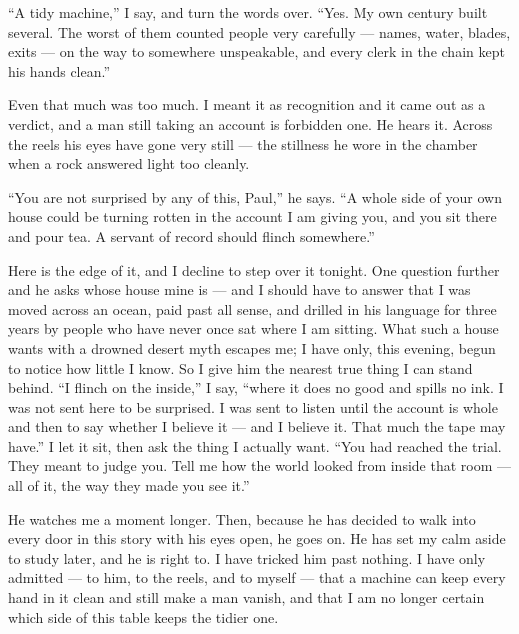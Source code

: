 \ornament

``A tidy machine,'' I say, and turn the words over. ``Yes. My own century built several. The worst of them counted people very carefully --- names, water, blades, exits --- on the way to somewhere unspeakable, and every clerk in the chain kept his hands clean.''\par

Even that much was too much. I meant it as recognition and it came out as a verdict, and a man still taking an account is forbidden one. He hears it. Across the reels his eyes have gone very still --- the stillness he wore in the chamber when a rock answered light too cleanly.\par

``You are not surprised by any of this, Paul,'' he says. ``A whole side of your own house could be turning rotten in the account I am giving you, and you sit there and pour tea. A servant of record should flinch somewhere.''\par

Here is the edge of it, and I decline to step over it tonight. One question further and he asks whose house mine is --- and I should have to answer that I was moved across an ocean, paid past all sense, and drilled in his language for three years by people who have never once sat where I am sitting. What such a house wants with a drowned desert myth escapes me; I have only, this evening, begun to notice how little I know. So I give him the nearest true thing I can stand behind. ``I flinch on the inside,'' I say, ``where it does no good and spills no ink. I was not sent here to be surprised. I was sent to listen until the account is whole and then to say whether I believe it --- and I believe it. That much the tape may have.'' I let it sit, then ask the thing I actually want. ``You had reached the trial. They meant to judge you. Tell me how the world looked from inside that room --- all of it, the way they made you see it.''\par

He watches me a moment longer. Then, because he has decided to walk into every door in this story with his eyes open, he goes on. He has set my calm aside to study later, and he is right to. I have tricked him past nothing. I have only admitted --- to him, to the reels, and to myself --- that a machine can keep every hand in it clean and still make a man vanish, and that I am no longer certain which side of this table keeps the tidier one.\par

